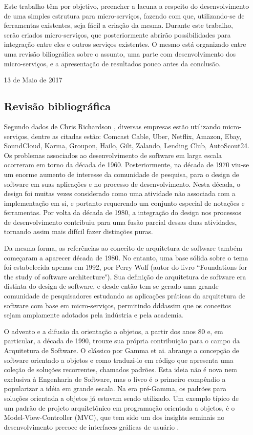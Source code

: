 \documentclass[journal]{IEEEtran}
\begin{document}
Este trabalho têm por objetivo, preencher a lacuna a respeito do desenvolvimento de uma simples estrutura para micro-serviços, fazendo com que, utilizando-se de ferramentas existentes, seja fácil a criação da mesma. Durante este trabalho, serão criados micro-serviços, que posteriormente abrirão possibilidades para integração entre eles e outros serviços existentes. O mesmo está organizado entre uma revisão biliográfica sobre o assunto, uma parte com desenvolvimento dos micro-serviços, e a apresentação de resultados pouco antes da conclusão.

\hfill 13 de Maio de 2017

\subsection{Revisão bibliográfica}

Segundo dados de Chris Richardson \cite{ChrisRichardson}, diversas empresas estão utilizando micro-serviços, dentre as citadas estão: Comcast Cable, Uber, Netflix, Amazon, Ebay, SoundCloud, Karma, Groupon, Hailo, Gilt, Zalando, Lending Club, AutoScout24.
Os problemas associados ao desenvolvimento de software em larga escala ocorreram em torno da década de 1960. Posteriormente, na década de 1970 viu-se um enorme aumento de interesse da comunidade de pesquisa, para o design de software em suas aplicações e no processo de desenvolvimento. Nesta década, o design foi muitas vezes considerado como uma atividade não associada com a implementação em si, e portanto requerendo um conjunto especial de notações e ferramentas. Por volta da década de 1980, a integração do design nos processos de desenvolvimento contribuiu para uma fusão parcial dessas duas atividades, tornando assim mais difícil fazer distinções puras.

Da mesma forma, as referências ao conceito de arquitetura de software também começaram a aparecer década de 1980. No entanto, uma base sólida sobre o tema foi estabelecida apenas em 1992, por Perry Wolf (autor do livro “Foundations for the study of software architecture"). Sua definição de arquitetura de software era distinta do design de software, e desde então tem-se gerado uma grande comunidade de pesquisadores estudando as aplicações práticas da arquitetura de software com base em micro-serviços, permitindo dddassim que os conceitos sejam amplamente adotados pela indústria e pela academia.

O advento e a difusão da orientação a objetos, a partir dos anos 80 e, em particular, a década de 1990, trouxe sua própria contribuição para o campo da Arquitetura de Software. O clássico por Gamma et ai. abrange a concepção de software orientado a objetos e como traduzi-lo em código que apresenta uma coleção de soluções recorrentes, chamados padrões. Esta ideia não é nova nem exclusiva à Engenharia de Software, mas o livro é o primeiro compêndio a popularizar a idéia em grande escala. Na era pré-Gamma, os padrões para soluções orientada a objetos já estavam sendo utilizado. Um exemplo típico de um padrão de projeto arquitetônico em programação orientada a objetos, é o Model-View-Controller (MVC), que tem sido um dos insights seminais no desenvolvimento precoce de interfaces gráficas de usuário \cite{nicoladragonietal}.
\end{document}
